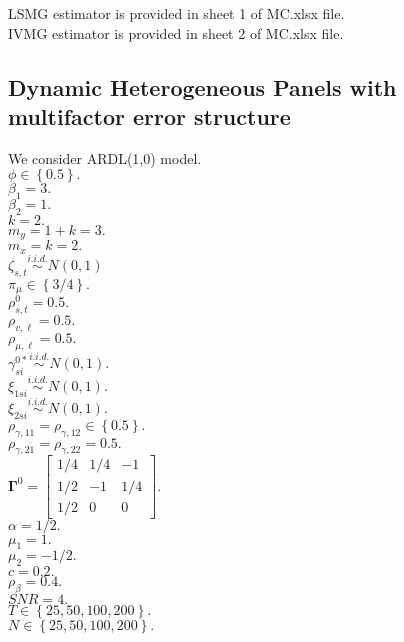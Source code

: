 \documentclass[12pt,a4paper,hyperref]{article}
\begin{document}
LSMG estimator is provided in sheet 1 of MC.xlsx file. \\
IVMG estimator is provided in sheet 2 of MC.xlsx file. \\




\subsection{Dynamic Heterogeneous Panels with multifactor error structure }
We consider ARDL(1,0) model. \\
$\phi \in \left\{0.5 \right\}.$ \\
 $\beta_{1}=3.$ \\
  $\beta_{2}=1.$ \\
  $k=2.$ \\
  $m_{y}=1+k=3.$\\
  $m_{x}=k=2.$\\
$\zeta_{s,t} \overset{i.i.d.}{\sim} N(0,1)$ \\
$\pi_{\mu} \in \left\{ 3/4\right\}.$ \\
$\rho^{0}_{s,t}=0.5.$ \\
$\rho_{v, \ell}=0.5.$\\
 $\rho_{\mu,\ell}=0.5.$ \\
  $\gamma^{0\ast}_{si}\overset{i.i.d.}{\sim}N\left(0, 1 \right).$ \\
 $\xi_{1si}\overset{i.i.d.}{\sim}N\left(0, 1 \right).$ \\
$\xi_{2si}\overset{i.i.d.}{\sim}N\left(0, 1 \right).$ \\
$\rho_{\gamma, 11}=\rho_{\gamma, 12} \in \left\{ 0.5 \right\}.$ \\
$\rho_{\gamma, 21}=\rho_{\gamma, 22}=0.5.$ \\
$
\boldsymbol{\Gamma}^{0}=
\begin{bmatrix}
1/4 & 1/4 & -1 \\
1/2 & -1  & 1/4 \\
1/2 & 0   & 0
\end{bmatrix} .
$ \\
$\alpha=1/2.$ \\
 $\mu_{1}=1.$\\
  $\mu_{2}=-1/2.$ \\
$c=0.2.$ \\
$\rho_{\beta}=0.4.$ \\
$SNR=4.$ \\
$T \in \left\{25, 50, 100, 200  \right\}.$ \\
 $N \in \left\{25, 50, 100, 200  \right\}.$ \\
\end{document}
